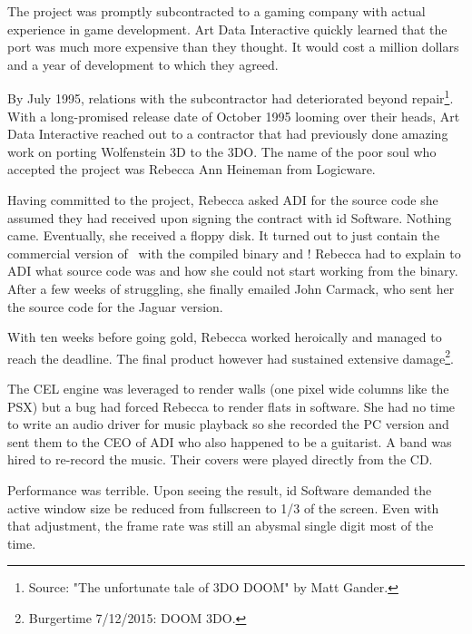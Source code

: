 The project was promptly subcontracted to a gaming company with actual experience in game development. Art Data Interactive quickly learned that the port was much more expensive than they thought. It would cost a million dollars and a year of development to which they agreed.\\
\par
By July 1995, relations with the subcontractor had deteriorated beyond repair\footnote{Source: "The unfortunate tale of 3DO DOOM" by Matt Gander.}. With a long-promised release date of October 1995 looming over their heads, Art Data Interactive reached out to a contractor that had previously done amazing work on porting Wolfenstein 3D to the 3DO. The name of the poor soul who accepted the project was Rebecca Ann Heineman from Logicware.\\
\par
Having committed to the project, Rebecca asked ADI for the source code she assumed they had received upon signing the contract with id Software. Nothing came. Eventually, she received a floppy disk. It turned out to just contain the commercial version of \doom~with the compiled binary  and ! Rebecca had to explain to ADI what source code was and how she could not start working from the binary. After a few weeks of struggling, she finally emailed John Carmack, who sent her the source code for the Jaguar version.\\
\par
 With ten weeks before going gold, Rebecca worked heroically and managed to reach the deadline. The final product however had sustained extensive damage\footnote{Burgertime 7/12/2015: DOOM 3DO.}.\\
\par
{}
\par
The CEL engine was leveraged to render walls (one pixel wide columns like the PSX) but a bug had forced Rebecca to render flats in software. She had no time to write an audio driver for music playback so she recorded the PC version and sent them to the CEO of ADI who also happened to be a guitarist. A band was hired to re-record the music. Their covers were played directly from the CD.\\ 
\par
 Performance was terrible. Upon seeing the result, id Software demanded the active window size be reduced from fullscreen to 1/3 of the screen. Even with that adjustment, the frame rate was still an abysmal single digit most of the time.\\
